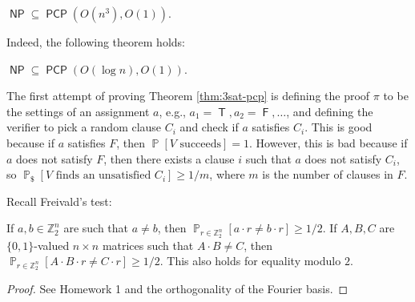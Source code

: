 \documentclass[letterpaper, reqno,11pt]{article}
\newcommand{\ZZ}{\mathbb{Z}}
\newcommand{\PP}{\mathop{{}\mathbb{P}}}
\DeclareMathOperator{\T}{\mathsf{T}}
\DeclareMathOperator{\F}{\mathsf{F}}
\DeclareMathOperator{\NP}{\mathsf{NP}}
\DeclareMathOperator{\PCP}{\mathsf{PCP}}
\begin{document}
\begin{corollary}
  $\NP \subseteq \PCP(O(n^3), O(1))$.
\end{corollary}

Indeed, the following theorem holds:

\begin{theorem}
  $\NP \subseteq \PCP(O(\log n), O(1))$.
\end{theorem}

The first attempt of proving Theorem \ref{thm:3sat-pcp} is defining the proof $\pi$ to be the settings of an assignment $a$, e.g., $a_1 = \T, a_2 = \F, \ldots$, and defining the verifier to pick a random clause $C_i$ and check if $a$ satisfies $C_i$. This is good because if $a$ satisfies $F$, then $\PP[\text{$V$ succeeds}] = 1$. However, this is bad because if $a$ does not satisfy $F$, then there exists a clause $i$ such that $a$ does not satisfy $C_i$, so $\PP_\$[\text{$V$ finds an unsatisfied $C_i$}] \geq 1/m$, where $m$ is the number of clauses in $F$.

Recall Freivald's test:

\begin{theorem}
  If $a, b \in \ZZ_2^n$ are such that $a \neq b$, then $\PP_{r \in \ZZ_2^n}[a \cdot r \neq b \cdot r] \geq 1/2$. If $A, B, C$ are $\{ 0, 1 \}$-valued $n \times n$ matrices such that $A \cdot B \neq C$, then $\PP_{r \in \ZZ_2^n}[A \cdot B \cdot r \neq C \cdot r] \geq 1/2$. This also holds for equality modulo $2$.
\end{theorem}

\begin{proof}
  See Homework 1 and the orthogonality of the Fourier basis.
\end{proof}
\end{document}
